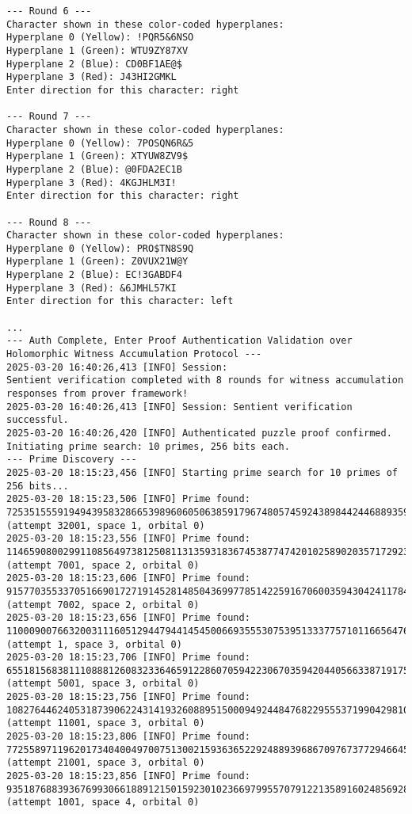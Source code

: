 \documentclass[10pt,twocolumn]{article}
\begin{document}
\begin{lstlisting}
--- Round 6 ---
Character shown in these color-coded hyperplanes:
Hyperplane 0 (Yellow): !PQR5&6NSO
Hyperplane 1 (Green): WTU9ZY87XV
Hyperplane 2 (Blue): CD0BF1AE@$
Hyperplane 3 (Red): J43HI2GMKL
Enter direction for this character: right

--- Round 7 ---
Character shown in these color-coded hyperplanes:
Hyperplane 0 (Yellow): 7POSQN6R&5
Hyperplane 1 (Green): XTYUW8ZV9$
Hyperplane 2 (Blue): @0FDA2EC1B
Hyperplane 3 (Red): 4KGJHLM3I!
Enter direction for this character: right

--- Round 8 ---
Character shown in these color-coded hyperplanes:
Hyperplane 0 (Yellow): PRO$TN8S9Q
Hyperplane 1 (Green): Z0VUX21W@Y
Hyperplane 2 (Blue): EC!3GABDF4
Hyperplane 3 (Red): &6JMHL57KI
Enter direction for this character: left

...
--- Auth Complete, Enter Proof Authentication Validation over Holomorphic Witness Accumulation Protocol ---
2025-03-20 16:40:26,413 [INFO] Session: 
Sentient verification completed with 8 rounds for witness accumulation responses from prover framework!
2025-03-20 16:40:26,413 [INFO] Session: Sentient verification successful.
2025-03-20 16:40:26,420 [INFO] Authenticated puzzle proof confirmed. Initiating prime search: 10 primes, 256 bits each.
--- Prime Discovery ---
2025-03-20 18:15:23,456 [INFO] Starting prime search for 10 primes of 256 bits...
2025-03-20 18:15:23,506 [INFO] Prime found: 72535155591949439583286653989606050638591796748057459243898442446889359734351 (attempt 32001, space 1, orbital 0)
2025-03-20 18:15:23,556 [INFO] Prime found: 114659080029911085649738125081131359318367453877474201025890203571729232791779 (attempt 7001, space 2, orbital 0)
2025-03-20 18:15:23,606 [INFO] Prime found: 91577035533705166901727191452814850436997785142259167060035943042411784618011 (attempt 7002, space 2, orbital 0)
2025-03-20 18:15:23,656 [INFO] Prime found: 110009007663200311160512944794414545006693555307539513337757101166564763025363 (attempt 1, space 3, orbital 0)
2025-03-20 18:15:23,706 [INFO] Prime found: 65518156838111088812608323364659122860705942230670359420440566338719175678611 (attempt 5001, space 3, orbital 0)
2025-03-20 18:15:23,756 [INFO] Prime found: 108276446240531873906224314193260889515000949244847682295553719904298102498283 (attempt 11001, space 3, orbital 0)
2025-03-20 18:15:23,806 [INFO] Prime found: 77255897119620173404004970075130021593636522924889396867097673772946645262731 (attempt 21001, space 3, orbital 0)
2025-03-20 18:15:23,856 [INFO] Prime found: 93518768839367699306618891215015923010236697995570791221358916024856928641679 (attempt 1001, space 4, orbital 0)

\end{lstlisting}
\end{document}
